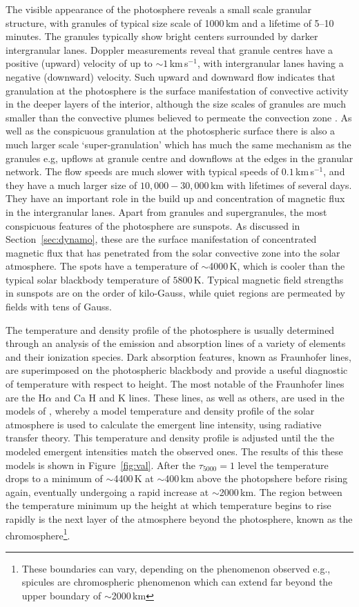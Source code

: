 The visible appearance of the photosphere reveals a small scale granular structure, with granules of typical size scale of 1000\,km and a lifetime of 5--10 minutes. The granules typically show bright centers surrounded by darker intergranular lanes. Doppler measurements reveal that granule centres have a positive (upward) velocity of up to $\sim1$\,km\,s$^{-1}$, with intergranular lanes having a negative (downward) velocity. Such upward and downward flow indicates that granulation at the photosphere is the surface manifestation of convective activity in the deeper layers of the interior, although the size scales of granules are much smaller than the convective plumes believed to permeate the convection zone \citep{schrijver2008b}. As well as the conspicuous granulation at the photospheric surface there is also a much larger scale \textquoteleft super-granulation' which has much the same mechanism as the granules e.g, upflows at granule centre and downflows at the edges in the granular network. The flow speeds are much slower with typical speeds of $0.1$\,km\,s$^{-1}$, and they have a much larger size of $10,000-30,000$\,km with lifetimes of several days. They have an important role in the build up and concentration of magnetic flux in the intergranular lanes. Apart from granules and supergranules, the most conspicuous features of the photosphere are sunspots. As discussed in Section~\ref{sec:dynamo}, these are the surface manifestation of concentrated magnetic flux that has penetrated from the solar convective zone into the solar atmosphere. The spots have a temperature of $\sim$4000\,K, which is cooler than the typical solar blackbody temperature of $5800$\,K. Typical magnetic field strengths in sunspots are on the order of kilo-Gauss, while quiet regions are permeated by fields with tens of Gauss.


The temperature and density profile of the photosphere is usually determined through an analysis of the emission and absorption lines of a variety of elements and their ionization species. Dark absorption features, known as Fraunhofer lines, are superimposed on the photospheric blackbody and provide a useful diagnostic of temperature with respect to height. The most notable of the Fraunhofer lines are the H$\alpha$ and Ca H and K lines. These lines, as well as others, are used in the models of \citep{vernazza1981, fontenla1988, gabriel1976}, whereby a model temperature and density profile of the solar atmosphere is used to calculate the emergent line intensity, using radiative transfer theory. This temperature and density profile is adjusted until the the modeled emergent intensities match the observed ones. The results of this these models is shown in Figure~\ref{fig:val}. After the $\tau_{5000}=1$ level the temperature drops to a minimum of $\sim$4400\,K at $\sim$400\,km above the photopshere before rising again, eventually undergoing a rapid increase at $\sim$2000\,km. The region between the temperature minimum up the height at which temperature begins to rise rapidly is the next layer of the atmosphere beyond the photosphere, known as the chromosphere\footnote{These boundaries can vary, depending on the phenomenon observed e.g., spicules are chromospheric phenomenon which can extend far beyond the upper boundary of $\sim$2000\,km}. 

